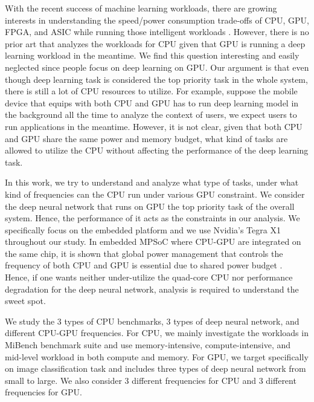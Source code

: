 With the recent success of machine learning workloads, there are growing interests in understanding the speed/power consumption trade-offs of CPU, GPU, FPGA, and ASIC while running those intelligent workloads \cite{malik2016architecture, nurvitadhi2016accelerating}. However, there is no prior art that analyzes the workloads for CPU given that GPU is running a deep learning workload in the meantime. We find this question interesting and easily neglected since people focus on deep learning on GPU. Our argument is that even though deep learning task is considered the top priority task in the whole system, there is still a lot of CPU resources to utilize. For example, suppose the mobile device that equips with both CPU and GPU has to run deep learning model in the background all the time to analyze the context of users, we expect users to run applications in the meantime. However, it is not clear, given that both CPU and GPU share the same power and memory budget, what kind of tasks are allowed to utilize the CPU without affecting the performance of the deep learning task.

In this work, we try to understand and analyze what type of tasks, under what kind of frequencies can the CPU run under various GPU constraint. We consider the deep neural network that runs on GPU the top priority task of the overall system. Hence, the performance of it acts as the constraints in our analysis. We specifically focus on the embedded platform and we use Nvidia's Tegra X1 throughout our study. In embedded MPSoC where CPU-GPU are integrated on the same chip, it is shown that global power management that controls the frequency of both CPU and GPU is essential due to shared power budget \cite{pathania2014integrated}. Hence, if one wants neither under-utilize the quad-core CPU nor performance degradation for the deep neural network, analysis is required to understand the sweet spot.

We study the 3 types of CPU benchmarks, 3 types of deep neural network, and different CPU-GPU frequencies. For CPU, we mainly investigate the workloads in MiBench benchmark suite \cite{mibench} and use memory-intensive, compute-intensive, and mid-level workload in both compute and memory. For GPU, we target specifically on image classification task and includes three types of deep neural network from small to large. We also consider 3 different frequencies for CPU and 3 different frequencies for GPU.
